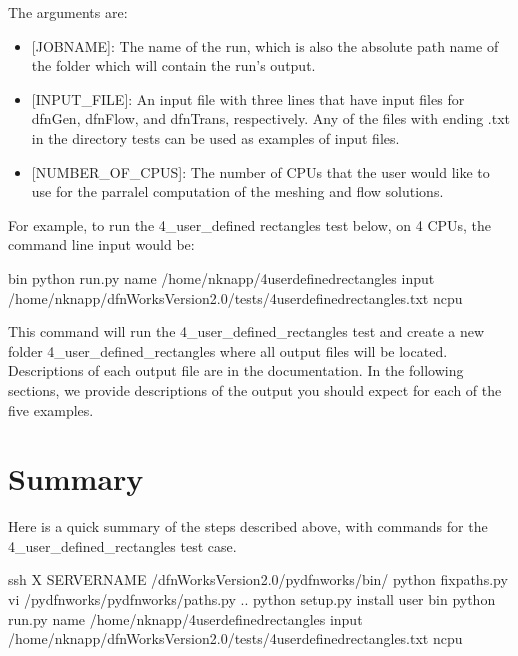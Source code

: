 \documentclass[letterpaper,10pt,english]{sphinxmanual}
\begin{document}
The arguments are:
\begin{itemize}
\item {} 
{[}JOBNAME{]}: The name of the run, which is also the absolute path name of the folder which will contain the run's output.

\item {} 
{[}INPUT\_FILE{]}: An input file with three lines that have input files for dfnGen, dfnFlow, and dfnTrans, respectively. Any of the files with ending .txt in the directory tests can be used as examples of input files.

\item {} 
{[}NUMBER\_OF\_CPUS{]}: The number of CPUs that the user would like to use for the parralel computation of the meshing and flow solutions.

\end{itemize}

For example, to run the 4\_user\_defined rectangles test below, on 4 CPUs,  the command line input would be:

\begin{sphinxVerbatim}[commandchars=\\\{\}]
\PYGZdl{}  bin
\PYGZdl{} python run.py \PYGZhy{}name /home/nknapp/4\PYGZus{}user\PYGZus{}defined\PYGZus{}rectangles
 \PYGZhy{}input /home/nknapp/dfnWorks\PYGZhy{}Version2.0/tests/4\PYGZus{}user\PYGZus{}defined\PYGZus{}rectangles.txt
 \PYGZhy{}ncpu 
\end{sphinxVerbatim}

This command will run the 4\_user\_defined\_rectangles test and create a new folder 4\_user\_defined\_rectangles where all output files will be located. Descriptions of each output file are in the documentation. In the following sections, we provide descriptions of the output you should expect for each of the five examples.


\section{Summary}
\label{\detokenize{tutorial:summary}}
Here is a quick summary of the steps described above, with commands for the 4\_user\_defined\_rectangles test case. 

\begin{sphinxVerbatim}[commandchars=\\\{\}]
\PYGZdl{} ssh \PYGZhy{}X SERVER\PYGZus{}NAME
\PYGZdl{}  \PYGZti{}/dfnWorks\PYGZhy{}Version2.0/pydfnworks/bin/
\PYGZdl{} python fix\PYGZus{}paths.py
\PYGZdl{} vi /pydfnworks/pydfnworks/paths.py
\PYGZdl{}  ..
\PYGZdl{} python setup.py install \PYGZhy{}\PYGZhy{}user
\PYGZdl{}  bin
\PYGZdl{} python run.py \PYGZhy{}name /home/nknapp/4\PYGZus{}user\PYGZus{}defined\PYGZus{}rectangles
 \PYGZhy{}input /home/nknapp/dfnWorks\PYGZhy{}Version2.0/tests/4\PYGZus{}user\PYGZus{}defined\PYGZus{}rectangles.txt
 \PYGZhy{}ncpu 
\end{sphinxVerbatim}
\end{document}
